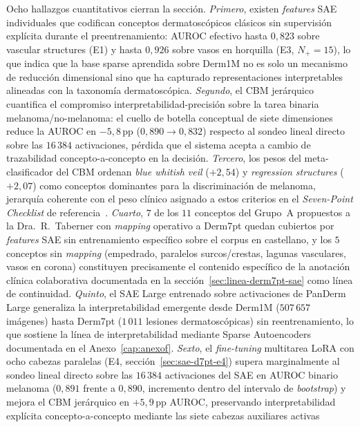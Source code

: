 Ocho hallazgos cuantitativos cierran la sección.
\textit{Primero}, existen \emph{features} SAE individuales que
codifican conceptos dermatoscópicos clásicos sin supervisión
explícita durante el preentrenamiento: AUROC efectivo hasta
$0{,}823$ sobre vascular structures (E1) y hasta $0{,}926$
sobre vasos en horquilla (E3, $N_{+} = 15$), lo que indica
que la base sparse aprendida sobre Derm1M no es solo un
mecanismo de reducción dimensional sino que ha capturado
representaciones interpretables alineadas con la taxonomía
dermatoscópica. \textit{Segundo}, el CBM jerárquico cuantifica
el compromiso interpretabilidad-precisión sobre la tarea binaria
melanoma/no-melanoma: el cuello de botella conceptual de siete
dimensiones reduce la AUROC en $-5{,}8$\,pp ($0{,}890 \to 0{,}832$)
respecto al sondeo lineal directo sobre las $16\,384$
activaciones, pérdida que el sistema acepta a cambio de
trazabilidad concepto-a-concepto en la decisión. \textit{Tercero},
los pesos del meta-clasificador del CBM ordenan
\emph{blue whitish veil} ($+2{,}54$) y \emph{regression
structures} ($+2{,}07$) como conceptos dominantes para la
discriminación de melanoma, jerarquía coherente con el peso
clínico asignado a estos criterios en el
\emph{Seven-Point Checklist} de
referencia~\cite{kawahara2019}. \textit{Cuarto}, $7$ de los
$11$ conceptos del Grupo~A propuestos a la Dra.~R.~Taberner
con \emph{mapping} operativo a Derm7pt quedan cubiertos por
\emph{features} SAE sin entrenamiento específico sobre el
corpus en castellano, y los $5$ conceptos sin \emph{mapping}
(empedrado, paralelos surcos/crestas, lagunas vasculares, vasos en
corona) constituyen precisamente el contenido específico de la
anotación clínica colaborativa documentada en la
secci\'on~\ref{sec:linea-derm7pt-sae} como línea de continuidad.
\textit{Quinto}, el SAE Large entrenado sobre activaciones de
PanDerm Large generaliza la interpretabilidad emergente desde
Derm1M ($507\,657$ imágenes) hasta Derm7pt
($1\,011$ lesiones dermatoscópicas) sin reentrenamiento, lo que
sostiene la línea de interpretabilidad mediante Sparse
Autoencoders documentada en el Anexo~\ref{cap:anexof}.
\textit{Sexto}, el \emph{fine-tuning} multitarea LoRA con ocho
cabezas paralelas (E4, secci\'on~\ref{sec:sae-d7pt-e4}) supera
marginalmente al sondeo lineal directo sobre las
$16\,384$ activaciones del SAE en AUROC binario melanoma
($0{,}891$ frente a $0{,}890$, incremento dentro del intervalo de
\emph{bootstrap}) y mejora el CBM jerárquico en $+5{,}9$\,pp
AUROC, preservando interpretabilidad explícita concepto-a-concepto
mediante las siete cabezas auxiliares activas

